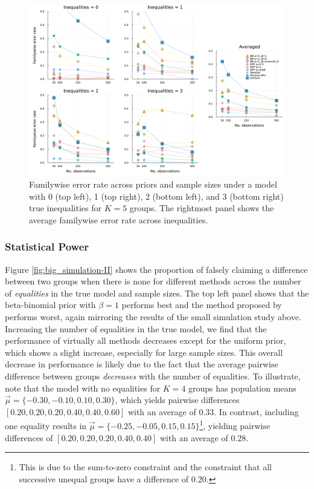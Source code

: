 \documentclass[11pt,a4paper]{article}
\theoremstyle{definition} %
\theoremstyle{case}
\begin{document}
\begin{figure}[!h]
    \centering
    \includegraphics[width=1\textwidth]{subset_k_5_alpha_familywise.pdf}
    \caption{Familywise error rate across priors and sample sizes under a model with 0 (top left), 1 (top right), 2 (bottom left), and 3 (bottom right) true inequalities for $K = 5$ groups. The rightmost panel shows the average familywise error rate across inequalities.}
    \label{fig:big_simulation-I}
\end{figure}

\subsubsection{Statistical Power}
Figure \ref{fig:big_simulation-II} shows the proportion of falsely claiming a difference between two groups when there is none for different methods across the number of \textit{equalities} in the true model and sample sizes. The top left panel shows that the beta-binomial prior with $\beta = 1$ performs best and the method proposed by \textcite{westfall1997bayesian} performs worst, again mirroring the results of the small simulation study above. Increasing the number of equalities in the true model, we find that the performance of virtually all methods decreases except for the uniform prior, which shows a slight increase, especially for large sample sizes. This overall decrease in performance is likely due to the fact that the average pairwise difference between groups \textit{decreases} with the number of equalities. To illustrate, note that the model with no equalities for $K = 4$ groups has population means $\vec{\mu} = \{-0.30, -0.10, 0.10, 0.30\}$, which yields pairwise differences $[0.20, 0.20, 0.20, 0.40, 0.40, 0.60]$ with an average of $0.33$. In contrast, including one equality results in $\vec{\mu} = \{-0.25, -0.05, 0.15, 0.15\}$\footnote{This is due to the sum-to-zero constraint and the constraint that all successive unequal groups have a difference of $0.20$.}, yielding pairwise differences of $[0.20, 0.20, 0.20, 0.40, 0.40]$ with an average of $0.28$.
\end{document}
